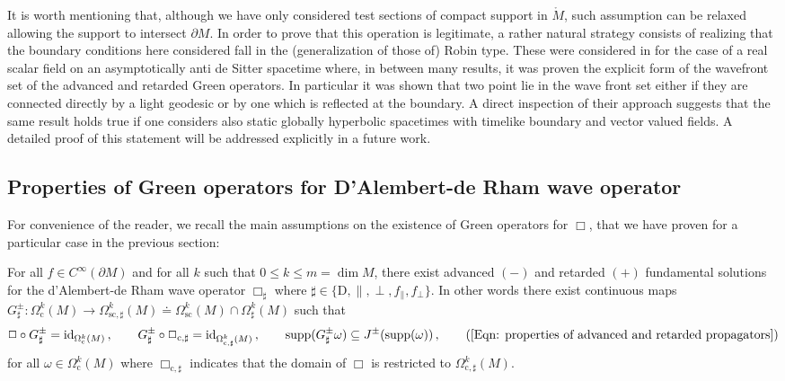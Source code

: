 \begin{remark}\label{Rmk: wave front}
	It is worth mentioning that, although we have only considered test sections of compact support in $\mathring{M}$, such assumption can be relaxed allowing the support to intersect $\partial M$.
	In order to prove that this operation is legitimate, a rather natural strategy consists of realizing that the boundary conditions here considered fall in the (generalization of those of) Robin type. These were considered in \cite{gannot2018propagation} for the case of a real scalar field on an asymptotically anti de Sitter spacetime where, in between many results, it was proven the explicit form of the wavefront set of the advanced and retarded Green operators. In particular it was shown that two point lie in the wave front set either if they are connected directly by a light geodesic or by one which is reflected at the boundary. A direct inspection of their approach suggests that the same result holds true if one considers also static globally hyperbolic spacetimes with timelike boundary and vector valued fields. A detailed proof of this statement will be addressed explicitly in a future work.
\end{remark}

\subsection{Properties of Green operators for D'Alembert-de Rham wave operator}\label{Sub: properties of G}

For convenience of the reader, we recall the main assumptions on the existence of Green operators for $\Box$, that we have proven for a particular case in the previous section:

\addtocounter{theorem}{-14}
\begin{assumption}
	For all $f\in C^\infty(\partial M)$ and for all $k$ such that $0\leq k\leq m=\dim M$, there exist advanced $(-)$ and retarded $(+)$ fundamental solutions for the d'Alembert-de Rham wave operator $\Box_\sharp$ where $\sharp\in\lbrace\mathrm{D},\parallel,\perp,f_\parallel,f_\perp\rbrace$. In other words there exist continuous maps $G^\pm_\sharp\colon\Omega_{\mathrm{c}}^k(M)\to\Omega_{\mathrm{sc},\sharp}^k(M)\doteq\Omega_{\mathrm{sc}}^k(M)\cap\Omega_\sharp^k(M)$ such that
	\begin{align}%
	\Box\circ G^\pm_\sharp = \operatorname{id}_{\Omega_{\mathrm{c}}^k(M)}\,,\qquad
	G^\pm_\sharp\circ\Box_{\mathrm{c},\sharp}=\operatorname{id}_{\Omega_{\mathrm{c},\sharp}^k(M)}\,,\qquad
	{\rm supp}(G^\pm_\sharp\omega)\subseteq J^\pm({\rm supp}(\omega))\,,\tag{\ref{Eqn: properties of advanced and retarded propagators}}
	\end{align}
	for all $\omega\in\Omega_{\mathrm{c}}^k(M)$ where $\Box_{\mathrm{c},\sharp}$ indicates that the domain of $\Box$ is restricted to $\Omega_{\mathrm{c},\sharp}^k(M)$.
\end{assumption}
\addtocounter{theorem}{13}

